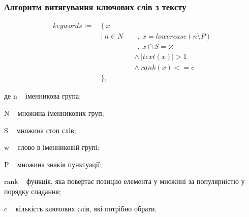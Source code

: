 \documentclass{beamer}
\begin{document}
\begin{frame}
\frametitle{Алгоритм витягування ключових слів з тексту}

\begin{equation}
	\begin{alignedat}{2}
	 keywords := ~&\{~ x \\
								&|~ n \in N &&~~,  ~ x = lowercase(n \setminus P) \\
								&           &&~~,  ~ x \cap S = \varnothing \\
								&           &&\land~ | text(x) | > 1 \\
								&           &&\land~ rank(x) <= c \\
								&\},
	\end{alignedat}
	\nonumber
\end{equation}

де n \textemdash~ іменникова група;
  
N \textemdash~ множина іменникових груп;

S \textemdash~ множина стоп слів;

w \textemdash~ слово в іменниковій групі;

P \textemdash~ множина знаків пунктуації;

rank \textemdash~ функція,
		яка повертає позицію елемента у множині за популярністю
		у порядку спадання;

c \textemdash~ кількість ключових слів, які потрібно обрати.
\end{frame}
\end{document}
